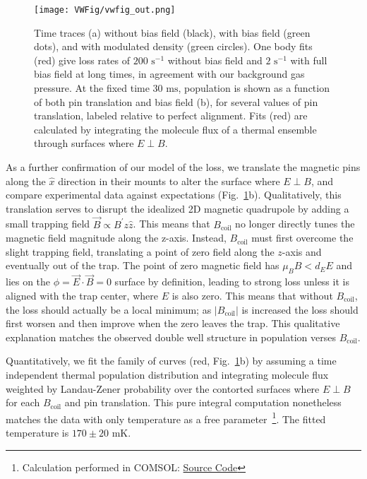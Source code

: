 \documentclass[%
 reprint,
 amsmath,amssymb,
 aps,
prl,
]{revtex4-1}
\newcommand{\bcl}{{$B_\text{coil}$}}
\newcommand{\epb}{{$E\!\perp\!B$}}
\newcommand{\cmnt}[1]{\ignorespaces}
\begin{document}
\begin{figure}[tb]
\texttt{[image: VWFig/vwfig\_out.png]}%
\caption{
Time traces (a) without bias field (black), with bias field (green dots), and with modulated density (green circles). One body fits (red) give loss rates of $200\text{ s}^{-1}$ without bias field and $2\text{ s}^{-1}$ with full bias field at long times, in agreement with our background gas pressure. At the fixed time $30\text{ ms}$, population is shown as a function of both pin translation and bias field (b), for several values of pin translation, labeled relative to perfect alignment. Fits (red) are calculated by integrating the molecule flux of a thermal ensemble through surfaces where \epb.
\label{fig:WVplot}}
\end{figure}


As a further confirmation of our \cmnt{\epb{}  and $\mu_BB<d_EE$} model of the loss, we translate the magnetic pins along the $\hat{x}$ direction in their mounts to alter the surface where \epb{}, and compare experimental data against expectations (Fig.~\ref{fig:WVplot}b). Qualitatively, this translation serves to disrupt the idealized 2D magnetic quadrupole by adding a small trapping field $\vec{B}\propto B^\prime z\hat{z}$. This means that \bcl{} no longer directly tunes the magnetic field magnitude along the z-axis. Instead, \bcl{} must first overcome the slight trapping field, translating a point of zero field along the $z$-axis and eventually out of the trap. The point of zero magnetic field has $\mu_BB<d_EE$ and lies on the $\phi=\vec{E}\cdot\vec{B}=0$ surface by definition, leading to strong loss unless it is aligned with the trap center, where $E$ is also zero. This means that without \bcl{}, the loss should actually be a local minimum; as $|B_\text{coil}|$ is increased the loss should first worsen and then improve when the zero leaves the trap. This qualitative explanation matches the observed double well structure in population verses \bcl.

Quantitatively, we fit the family of curves (red, Fig.~\ref{fig:WVplot}b) by assuming a time independent thermal population distribution and integrating molecule flux weighted by Landau-Zener probability over the contorted surfaces where \epb{} for each \bcl{} and pin translation. This pure integral computation nonetheless matches the data with only temperature as a free parameter~\footnote{Calculation performed in COMSOL: \href{https://github.com/dreens/spin-flip-integration/}{Source Code}}. \cmnt{The asymmetry of the curves about $B_\text{coil}=0$ comes from a slight shift of the electric quadrupole field caused by an intentional bending of the last pin pair. This bend enhances laser induced fluorescence collection, our detection technique.} The fitted temperature is $170\pm20\text{ mK}$. 
\end{document}

